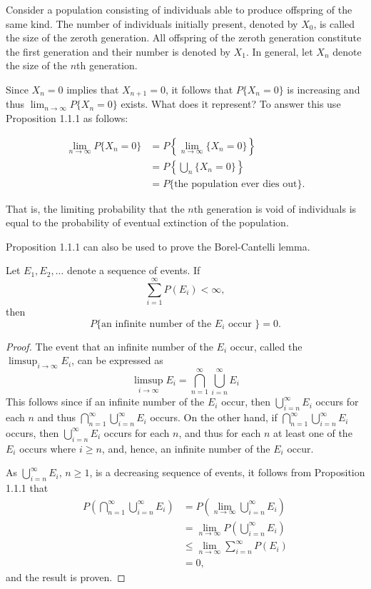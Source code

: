 \documentclass[lang=cn,10pt]{elegantbook}
\begin{document}
\begin{example}
	Consider a population consisting of individuals able to produce offspring of the same kind. The number of individuals initially present, denoted by \(X_0\), is called the size of the zeroth generation. All offspring of the zeroth generation constitute the first generation and their number is denoted by \(X_1\). In general, let \(X_n\) denote the size of the \(n\)th generation.

Since \(X_n = 0\) implies that \(X_{n+1} = 0\), it follows that \(P\{X_n = 0\}\) is increasing and thus \(\lim_{n \to \infty} P\{X_n = 0\}\) exists. What does it represent? To answer this use Proposition 1.1.1 as follows:

\[
\begin{aligned}
\lim_{n \to \infty} P\{X_n = 0\} &= P\left\{\lim_{n \to \infty} \{X_n = 0\}\right\} \\
&= P\left\{\bigcup_n \{X_n = 0\}\right\} \\
&= P\{\text{the population ever dies out}\}.
\end{aligned}
\]

That is, the limiting probability that the \(n\)th generation is void of individuals is equal to the probability of eventual extinction of the population.
\end{example}
Proposition 1.1.1 can also be used to prove the Borel-Cantelli lemma.
\begin{proposition}
	Let \(E_1, E_2, \ldots\) denote a sequence of events. If
\[
\sum_{i=1}^{\infty} P(E_i) < \infty,
\]
then
\[
P\{\text{an infinite number of the } E_i \text{ occur }\} = 0.
\]

\end{proposition}
\begin{proof}
	The event that an infinite number of the \(E_i\) occur, called the \(\limsup_{i \to \infty} E_i\), can be expressed as
	\[
	\limsup_{i \to \infty} E_i = \bigcap_{n=1}^{\infty} \bigcup_{i=n}^{\infty} E_i
	\]
	This follows since if an infinite number of the \(E_i\) occur, then \(\bigcup_{i=n}^{\infty} E_i\) occurs for each \(n\) and thus \(\bigcap_{n=1}^{\infty} \bigcup_{i=n}^{\infty} E_i\) occurs. On the other hand, if \(\bigcap_{n=1}^{\infty} \bigcup_{i=n}^{\infty} E_i\) occurs, then \(\bigcup_{i=n}^{\infty} E_i\) occurs for each \(n\), and thus for each \(n\) at least one of the \(E_i\) occurs where \(i \geq n\), and, hence, an infinite number of the \(E_i\) occur.
	
	As \(\bigcup_{i=n}^{\infty} E_i\), \(n \geq 1\), is a decreasing sequence of events, it follows from Proposition 1.1.1 that
	\begin{align*}
	P\left( \bigcap_{n=1}^{\infty} \bigcup_{i=n}^{\infty} E_i \right) &= P\left( \lim_{n \to \infty} \bigcup_{i=n}^{\infty} E_i \right) \\
	&= \lim_{n \to \infty} P\left( \bigcup_{i=n}^{\infty} E_i \right) \\
	&\leq \lim_{n \to \infty} \sum_{i=n}^{\infty} P(E_i) \\
	&= 0,
	\end{align*}
	and the result is proven.
\end{proof}
\end{document}
